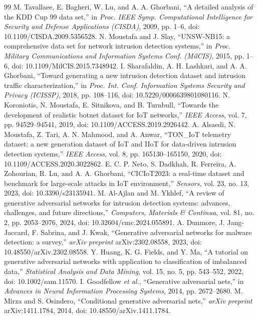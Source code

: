 \documentclass{iaesarticle}
\begin{document}
\begin{thebibliography}{99}
 M. Tavallaee, E. Bagheri, W. Lu, and A. A. Ghorbani, ``A detailed analysis of the KDD Cup 99 data set,'' in \textsl{Proc. IEEE Symp. Computational Intelligence for Security and Defense Applications (CISDA)}, 2009, pp. 1--6, doi: 10.1109/CISDA.2009.5356528.
 N. Moustafa and J. Slay, ``UNSW-NB15: a comprehensive data set for network intrusion detection systems,'' in \textsl{Proc. Military Communications and Information Systems Conf. (MilCIS)}, 2015, pp. 1--6, doi: 10.1109/MilCIS.2015.7348942.
 I. Sharafaldin, A. H. Lashkari, and A. A. Ghorbani, ``Toward generating a new intrusion detection dataset and intrusion traffic characterization,'' in \textsl{Proc. Int. Conf. Information Systems Security and Privacy (ICISSP)}, 2018, pp. 108--116, doi: 10.5220/0006639801080116.
 N. Koroniotis, N. Moustafa, E. Sitnikova, and B. Turnbull, ``Towards the development of realistic botnet dataset for IoT networks,'' \textsl{IEEE Access}, vol. 7, pp. 94529--94541, 2019, doi: 10.1109/ACCESS.2019.2926442.
 A. Alsaedi, N. Moustafa, Z. Tari, A. N. Mahmood, and A. Anwar, ``TON\_IoT telemetry dataset: a new generation dataset of IoT and IIoT for data-driven intrusion detection systems,'' \textsl{IEEE Access}, vol. 8, pp. 165130--165150, 2020, doi: 10.1109/ACCESS.2020.3022862.
 E. C. P. Neto, S. Dadkhah, R. Ferreira, A. Zohourian, R. Lu, and A. A. Ghorbani, ``CICIoT2023: a real-time dataset and benchmark for large-scale attacks in IoT environment,'' \textsl{Sensors}, vol. 23, no. 13, 2023, doi: 10.3390/s23135941.
 M. Al-Ajlan and M. Ykhlef, ``A review of generative adversarial networks for intrusion detection systems: advances, challenges, and future directions,'' \textsl{Computers, Materials \& Continua}, vol. 81, no. 2, pp. 2053--2076, 2024, doi: 10.32604/cmc.2024.055891.
 A. Dunmore, J. Jang-Jaccard, F. Sabrina, and J. Kwak, ``Generative adversarial networks for malware detection: a survey,'' \textsl{arXiv preprint} arXiv:2302.08558, 2023, doi: 10.48550/arXiv.2302.08558.
 Y. Huang, K. G. Fields, and Y. Ma, ``A tutorial on generative adversarial networks with application to classification of imbalanced data,'' \textsl{Statistical Analysis and Data Mining}, vol. 15, no. 5, pp. 543--552, 2022, doi: 10.1002/sam.11570.
 I. Goodfellow \textsl{et al.}, ``Generative adversarial nets,'' in \textsl{Advances in Neural Information Processing Systems}, 2014, pp. 2672--2680.
 M. Mirza and S. Osindero, ``Conditional generative adversarial nets,'' \textsl{arXiv preprint} arXiv:1411.1784, 2014, doi: 10.48550/arXiv.1411.1784.

\end{thebibliography}
\end{document}
